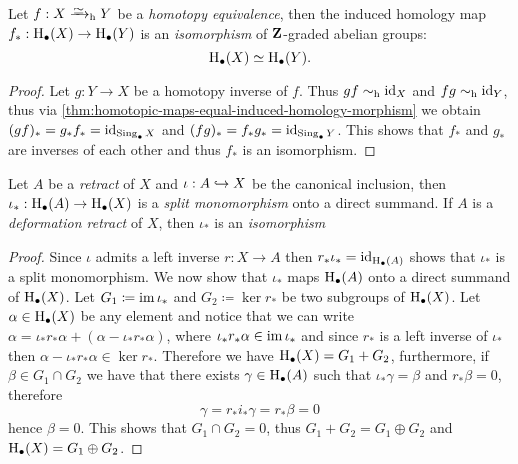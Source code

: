\begin{corollary}
\label{cor:htpy-equiv-iso-homology}
Let \(f: X \isotoht Y\) be a \emph{homotopy equivalence}, then the induced
homology map \(f_{*}: \operatorname{H}_{\bullet}(X) \to \operatorname{H}_{\bullet}(Y)\) is an
\emph{isomorphism} of \(\mathbf{Z}\)-graded abelian groups:
\[
\operatorname{H}_{\bullet}(X) \simeq \operatorname{H}_{\bullet}(Y).
\]
\end{corollary}

\begin{proof}
Let \(g: Y \to X\) be a homotopy inverse of \(f\). Thus \(g f \sim_{\text{h}} \operatorname{id}_X\) and
\(f g \sim_{\text{h}} \operatorname{id}_Y\), thus via
\cref{thm:homotopic-maps-equal-induced-homology-morphism} we obtain \((g f)_{*}
= g_{*} f_{*} = \operatorname{id}_{\operatorname{Sing}_{\bullet} X}\) and \((f g)_{*} = f_{*} g_{*} =
\operatorname{id}_{\operatorname{Sing}_{\bullet} Y}\). This shows that \(f_{*}\) and \(g_{*}\) are inverses
of each other and thus \(f_{*}\) is an isomorphism.
\end{proof}

\begin{corollary}
\label{cor:retract-monic-homology}
Let \(A\) be a \emph{retract} of \(X\) and \(\iota: A \hookrightarrow X\) be the canonical
inclusion, then \(\iota_{*}: \operatorname{H}_{\bullet}(A) \to \operatorname{H}_{\bullet}(X)\) is a
\emph{split monomorphism} onto a direct summand. If \(A\) is a \emph{deformation
  retract} of \(X\), then \(\iota_{*}\) is an \emph{isomorphism}
\end{corollary}

\begin{proof}
Since \(\iota\) admits a left inverse \(r: X \to A\) then
\(r_{*} \iota_{*} = \operatorname{id}_{\operatorname{H}_{\bullet}(A)}\) shows that \(\iota_{*}\) is a
split monomorphism. We now show that \(\iota_{*}\) maps \(\operatorname{H}_{\bullet}(A)\)
onto a direct summand of \(\operatorname{H}_{\bullet}(X)\). Let
\(G_1 \coloneq \operatorname{im} \iota_{*}\) and \(G_2 \coloneq \ker r_{*}\) be two subgroups
of \(\operatorname{H}_{\bullet}(X)\). Let \(\alpha \in \operatorname{H}_{\bullet}(X)\) be any element
and notice that we can write
\(\alpha = \iota_{*} r_{*} \alpha + (\alpha - \iota_{*} r_{*} \alpha)\), where
\(\iota_{*} r_{*} \alpha \in \operatorname{im} \iota_{*}\) and since \(r_{*}\) is a left
inverse of \(\iota_{*}\) then
\(\alpha - \iota_{*} r_{*} \alpha \in \ker r_{*}\). Therefore we have
\(\operatorname{H}_{\bullet}(X) = G_1 + G_2\), furthermore, if \(\beta \in G_1 \cap G_2\)
we have that there exists \(\gamma \in \operatorname{H}_{\bullet}(A)\) such that
\(\iota_{*} \gamma = \beta\) and \(r_{*} \beta = 0\), therefore
\[
\gamma = r_{*} i_{*} \gamma = r_{*} \beta = 0
\]
hence \(\beta = 0\). This shows that \(G_1 \cap G_2 = 0\), thus
\(G_1 + G_2 = G_1 \oplus G_2\) and \(\operatorname{H}_{\bullet}(X) = G_1 \oplus G_2\).
\end{proof}

